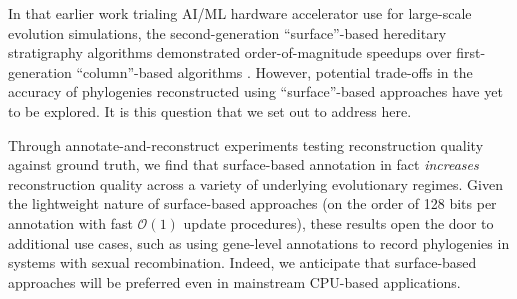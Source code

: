In that earlier work trialing AI/ML hardware accelerator use for large-scale evolution simulations, the second-generation ``surface''-based hereditary stratigraphy algorithms demonstrated order-of-magnitude speedups over first-generation ``column''-based algorithms \citep{moreno2024trackable}.
However, potential trade-offs in the accuracy of phylogenies reconstructed using ``surface''-based approaches have yet to be explored.
It is this question that we set out to address here.

Through annotate-and-reconstruct experiments testing reconstruction quality against ground truth, we find that surface-based annotation in fact \textit{increases} reconstruction quality across a variety of underlying evolutionary regimes.
Given the lightweight nature of surface-based approaches (on the order of 128 bits per annotation with fast $\mathcal{O}(1)$ update procedures), these results open the door to additional use cases, such as using gene-level annotations to record phylogenies in systems with sexual recombination.
Indeed, we anticipate that surface-based approaches will be preferred even in mainstream CPU-based applications.



